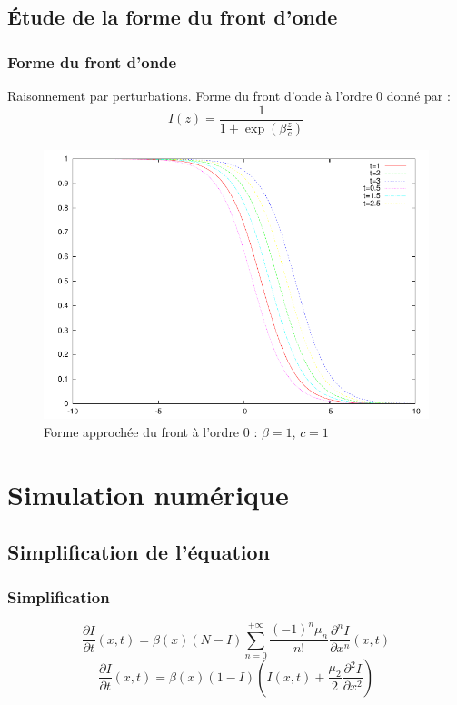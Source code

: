 \documentclass[handout]{beamer}
\newcommand{\derPar}[2]{\frac{\partial #1}{\partial #2}}
\begin{document}
\subsection[Forme]{Étude de la forme du front d'onde}
\begin{frame}
	\frametitle{Forme du front d'onde}
	Raisonnement par perturbations. Forme du front d'onde à l'ordre 0 donné par :
	\[I(z)=\frac{1}{1+\exp\left(\beta\frac{z}{c}\right)}\]
\begin{figure}[!h]
	\centering
	\includegraphics[scale=0.5]{img/plotShape.pdf}
\caption{Forme approchée du front à l'ordre 0 : $\beta=1$, $c=1$}
\label{plotShape}
\end{figure}
\end{frame}


\section[Simulation]{Simulation numérique}
\subsection[Simplification]{Simplification de l'équation}
\begin{frame}
	\frametitle{Simplification}
\[\frac{\partial I}{\partial t}(x,t) =\beta(x)(N-I)\sum_{n=0}^{+\infty} \frac{(-1)^n\mu_n}{n!} \frac{\partial^n I}{\partial x^n}(x,t)\]
\begin{equation}\label{approx}
	\derPar{I}{t}(x,t)=\beta(x)(1-I)\left(I(x,t)+\frac{\mu_2}{2}\derPar{{}^2I}{x^2}\right)
\end{equation}

\end{frame}
\end{document}
